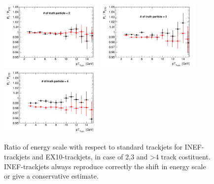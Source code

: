 \begin{figure}[tp]
\centering
\includegraphics[width=0.45\textwidth]{figure/trackjet/T7/ratio_pt_2.pdf}
\includegraphics[width=0.45\textwidth]{figure/trackjet/T7/ratio_pt_3.pdf}
\includegraphics[width=0.45\textwidth]{figure/trackjet/T7/ratio_pt_4.pdf}
\caption{Ratio of energy scale with respect to standard trackjets for INEF-trackjets and EX10-trackjets, in case of 2,3 and >4 track costituent.
	INEF-trackjets always reproduce correctly the shift in energy scale or give a conservative estimate.}

\label{fig:}
\end{figure}    
























